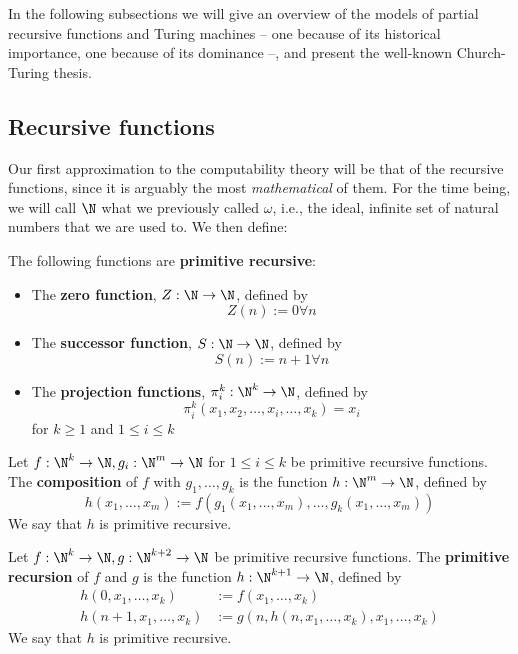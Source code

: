 \documentclass[../main.tex]{memoir}
\begin{document}
In the following subsections we will give an overview of the models of partial recursive functions and Turing machines -- one because of its historical importance, one because of its dominance --, and present the well-known Church-Turing thesis.

\subsection{Recursive functions}

Our first approximation to the computability theory will be that of the recursive functions, since it is arguably the most \textit{mathematical} of them. For the time being, we will call $\N$ what we previously called $\omega$, i.e., the ideal, infinite set of natural numbers that we are used to. We then define:

\begin{definition}
  \label{def:initial-functions}
  The following functions are \textbf{primitive recursive}:

  \begin{itemize}
  \item The \textbf{zero function}, $Z: \N \to \N$, defined by
    \[ Z(n) := 0 \forall n \]
  \item The \textbf{successor function}, $S: \N \to \N$, defined by
    \[ S(n) := n + 1 \forall n \]
  \item The \textbf{projection functions}, $\pi_i^k: \N^k \to \N$, defined by
    \[ \pi_i^k(x_1, x_2, \ldots, x_i, \ldots, x_k) = x_i \]
    for $k \ge 1$ and $1 \le i \le k$
  \end{itemize}
\end{definition}

\begin{definition}[Composition]
  Let $f: \N^k \to \N, g_i: \N^m \to \N$ for $1 \le i \le k$ be primitive recursive functions. The \textbf{composition} of $f$ with $g_1, \ldots, g_k$ is the function $h: \N^m \to \N$, defined by
  \[ h(x_1, \ldots, x_m) := f(g_1(x_1, \ldots, x_m), \ldots, g_k(x_1, \ldots, x_m)) \]
  We say that $h$ is primitive recursive.
\end{definition}

\begin{definition}
  Let $f: \N^k \to \N, g: \N^{k + 2} \to \N$ be primitive recursive functions. The \textbf{primitive recursion} of $f$ and $g$ is the function $h: \N^{k + 1} \to \N$, defined by
  \begin{align*}
    h(0, x_1, \ldots, x_k) & := f(x_1, \ldots, x_k) \\
    h(n + 1, x_1, \ldots, x_k) & := g(n, h(n, x_1, \ldots, x_k), x_1, \ldots, x_k)
  \end{align*}
  We say that $h$ is primitive recursive.
\end{definition}
\end{document}

